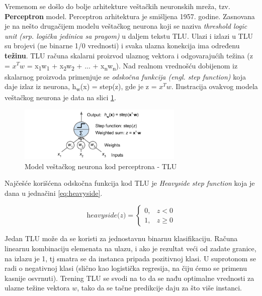 \documentclass[a4paper,12pt]{report}
\begin{document}
Vremenom se došlo do bolje arhitekture veštačkih neuronskih mreža, tzv. \textbf{Perceptron} model. Perceptron arhitektura je smišljena 1957. godine. Zasnovana je na nešto drugačijem modelu veštačkog neurona koji se naziva \textit{threshold logic unit (srp. logička jedinica sa pragom)} u daljem tekstu TLU. Ulazi i izlazi u TLU su brojevi (ne binarne 1/0 vrednosti) i svaka ulazna konekcija ima određenu \textbf{težinu}. TLU računa skalarni proizvod ulaznog vektora i odgovarajućih težina (z = $x^T w$ = x\textsubscript{1}w\textsubscript{1} + x\textsubscript{2}w\textsubscript{2} + ... + x\textsubscript{n}w\textsubscript{n}).  Nad realnom vrednošću dobijenom iz skalarnog proizvoda primenjuje se \textit{odskočna funkcija (engl. step function)} koja daje izlaz iz neurona, h\textsubscript{w}(x) = step(z), gde je z = $x^T w$. Ilustracija ovakvog modela veštačkog neurona je data na slici \ref{fig:perceptronAn}.

\begin{figure}[h]
    \centering
    \includegraphics[width=0.7\textwidth]{perceptron_an_model.png}
    \caption{Model veštačkog neurona kod perceptrona - TLU}\label{fig:perceptronAn}
\end{figure}

Najčešće korišćena odskočna funkcija kod TLU je \textit{Heavyside step function} koja je dana u jednačini \eqref{eq:heavyside}. 

\begin{equation}\label{eq:heavyside}
  \textit{heavyside(z)} =
  \begin{cases}
    0, & \textit{z} < 0 \\
    1, & \textit{z} \geq 0
  \end{cases}
\end{equation}

Jedan TLU može da se koristi za jednostavnu binarnu klasifikaciju. Računa linearnu kombinaciju elemenata na ulazu, i ako je rezultat veći od zadate granice, na izlazu je 1, tj smatra se da instanca pripada pozitivnoj klasi. U suprotonom se radi o negativnoj klasi (slično kao logistička regresija, na čiju ćemo se primenu kasnije osvrnuti). Trening TLU se svodi na to da se nađu optimalne vrednosti za ulazne težine vektora $w$, tako da se tačne predikcije daju za što više instanci. \\
\end{document}
